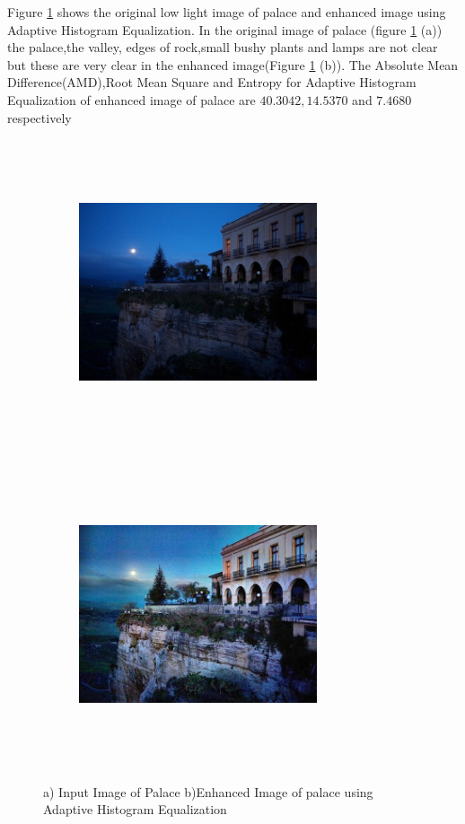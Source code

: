 Figure \ref{fig:palaceAHE} shows the original low light image of palace and enhanced image using Adaptive Histogram Equalization. In the original image of palace (figure \ref{fig:palaceAHE} (a))  the palace,the valley, edges of rock,small bushy plants and lamps are not clear but these are very clear in the enhanced image(Figure \ref{fig:palaceAHE} (b)). The Absolute Mean Difference(AMD),Root Mean Square and Entropy for Adaptive Histogram Equalization of enhanced image of palace are $40.3042, 14.5370$ and $7.4680$ respectively      


\begin{figure}
	\begin{subfigure}{8cm}
		\centering    
    	\includegraphics[width=7cm,height=9cm,keepaspectratio]{images/ch5/palace_input.jpg}
    	\caption{} 
    \end{subfigure}
  	\begin{subfigure}{6cm}
  		\centering
  		\includegraphics[width=7cm,height=9cm,keepaspectratio]{images/ch5/palace_adapt_hist.jpg}
   		\caption{}
  	\end{subfigure}
  	\caption{a) Input Image of Palace b)Enhanced Image of palace using Adaptive Histogram Equalization}
  	\label{fig:palaceAHE}
\end{figure}

